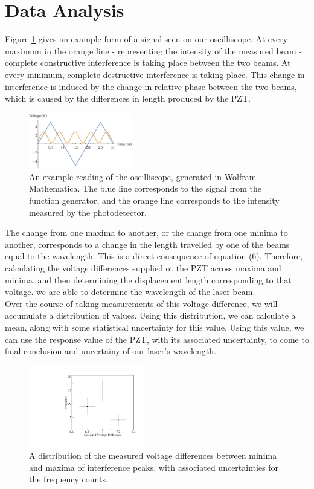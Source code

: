   \section{Data Analysis}
    Figure \ref{fig:waveform} gives an example form of a signal seen on our oscilliscope. At every maximum in the orange line - representing the intensity of the measured beam - complete constructive interference is taking place between the two beams. At every minimum, complete destructive interference is taking place. This change in interference is induced by the change in relative phase between the two beams, which is caused by the differences in length produced by the PZT.
   \begin{figure}[t]
    \includegraphics[width=0.4\textwidth]{waveform.pdf}
    \caption{An example reading of the oscilliscope, generated in Wolfram Mathematica. The blue line corresponds to the signal from the function generator, and the orange line corresponds to the intensity measured by the photodetector.}
    \label{fig:waveform}
    \end{figure}
    The change from one maxima to another, or the change from one minima to another, corresponds to a change in the length travelled by one of the beams equal to the wavelength. This is a direct consequence of equation (6). Therefore, calculating the voltage differences supplied ot the PZT across maxima and minima, and then determining the displacement length corresponding to that voltage. we are able to determine the wavelength of the laser beam.
    \\
    Over the course of taking measurements of this voltage difference, we will accumulate a distribution of values. Using this distribution, we can calculate a mean, along with some statistical uncertainty for this value. Using this value, we can use the response value of the PZT, with its associated uncertainty, to come to final conclusion and uncertainy of our laser's wavelength.
    \begin{figure}[h]
      \includegraphics[width=0.45\textwidth]{graph_times.pdf}
      \caption{A distribution of the measured voltage differences between minima and maxima of interference peaks, with associated uncertainties for the frequency counts.}
      \label{fig:graph}
    \end{figure}
